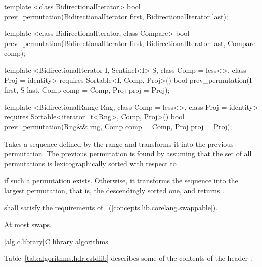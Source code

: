 %
\begin{removedblock}
\begin{itemdecl}
template <class BidirectionalIterator>
  bool prev_permutation(BidirectionalIterator first,
                        BidirectionalIterator last);

template <class BidirectionalIterator, class Compare>
  bool prev_permutation(BidirectionalIterator first,
                        BidirectionalIterator last, Compare comp);
\end{itemdecl}
\end{removedblock}
\begin{addedblock}
\begin{itemdecl}
template <BidirectionalIterator I, Sentinel<I> S, class Comp = less<>,
    class Proj = identity>
  requires Sortable<I, Comp, Proj>()
  bool prev_permutation(I first, S last, Comp comp = Comp{}, Proj proj = Proj{});

template <BidirectionalRange Rng, class Comp = less<>,
    class Proj = identity>
  requires Sortable<iterator_t<Rng>, Comp, Proj>()
  bool
    prev_permutation(Rng&& rng, Comp comp = Comp{}, Proj proj = Proj{});
\end{itemdecl}
\end{addedblock}

\begin{itemdescr}
\pnum
\effects
Takes a sequence defined by the range
and transforms it into the previous permutation.
The previous permutation is found by assuming that the set of all permutations is
lexicographically sorted with respect to
 .

\pnum
\returns
{}
if such a permutation exists.
Otherwise, it transforms the sequence into the largest permutation,
that is, the descendingly sorted one, and returns
.

\begin{removedblock}
\pnum
\requires
{} shall satisfy the requirements of
~(\ref{concepts.lib.corelang.swappable}).
\end{removedblock}

\pnum
\complexity
At most
swaps.
\end{itemdescr}

[alg.c.library]{C library algorithms}

\pnum
Table~\ref{tab:algorithms.hdr.cstdlib} describes some of the contents of the header .

